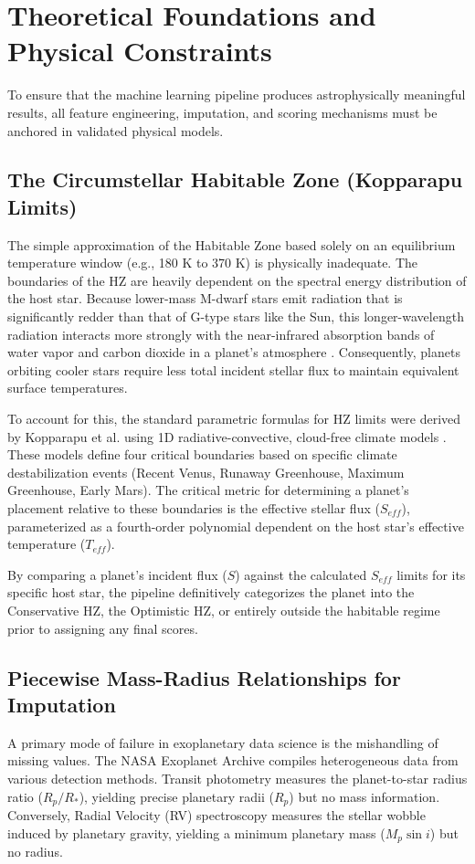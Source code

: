 \documentclass[conference]{IEEEtran}
\begin{document}
\section{Theoretical Foundations and Physical Constraints}
To ensure that the machine learning pipeline produces astrophysically meaningful results, all feature engineering, imputation, and scoring mechanisms must be anchored in validated physical models. 

\subsection{The Circumstellar Habitable Zone (Kopparapu Limits)}
The simple approximation of the Habitable Zone based solely on an equilibrium temperature window (e.g., 180 K to 370 K) is physically inadequate. The boundaries of the HZ are heavily dependent on the spectral energy distribution of the host star. Because lower-mass M-dwarf stars emit radiation that is significantly redder than that of G-type stars like the Sun, this longer-wavelength radiation interacts more strongly with the near-infrared absorption bands of water vapor and carbon dioxide in a planet's atmosphere \cite{InnerEdgeHZ}. Consequently, planets orbiting cooler stars require less total incident stellar flux to maintain equivalent surface temperatures.

To account for this, the standard parametric formulas for HZ limits were derived by Kopparapu et al. using 1D radiative-convective, cloud-free climate models \cite{HabitableZonesMainSequence}. These models define four critical boundaries based on specific climate destabilization events (Recent Venus, Runaway Greenhouse, Maximum Greenhouse, Early Mars). The critical metric for determining a planet's placement relative to these boundaries is the effective stellar flux ($S_{eff}$), parameterized as a fourth-order polynomial dependent on the host star's effective temperature ($T_{eff}$).

By comparing a planet's incident flux ($S$) against the calculated $S_{eff}$ limits for its specific host star, the pipeline definitively categorizes the planet into the Conservative HZ, the Optimistic HZ, or entirely outside the habitable regime prior to assigning any final scores.

\subsection{Piecewise Mass-Radius Relationships for Imputation}
A primary mode of failure in exoplanetary data science is the mishandling of missing values. The NASA Exoplanet Archive compiles heterogeneous data from various detection methods. Transit photometry measures the planet-to-star radius ratio ($R_p/R_*$), yielding precise planetary radii ($R_p$) but no mass information. Conversely, Radial Velocity (RV) spectroscopy measures the stellar wobble induced by planetary gravity, yielding a minimum planetary mass ($M_p \sin i$) but no radius.
\end{document}

